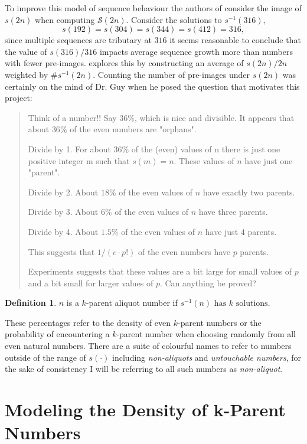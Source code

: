 \documentclass{article}
\theoremstyle{definition}
\newtheorem{definition}{Definition}[section]
\begin{document}
To improve this model of sequence behaviour the authors of \cite{chum_guy_jacobson_mosunov_2018} consider the image of $s(2n)$ when computing $\mathcal{S}(2n)$. Consider the solutions to $s^{-1}(316),$
$$s(192) = s(304) = s(344) = s(412) = 316,$$
since multiple sequences are tributary at $316$ it seems reasonable to conclude that the value of $s(316) / 316$ impacts average sequence growth more than numbers with fewer pre-images. \cite{chum_guy_jacobson_mosunov_2018} explores this by constructing an average of $s(2n)/2n$ weighted by $\#s^{-1}(2n)$. Counting the number of pre-images under $s(2n)$ was certainly on the mind of Dr. Guy when he posed the question that motivates this project:
%
\begin{quote}
    Think of a number!! Say $36$\%, which is nice and divisible. It appears that about $36$\% of the even numbers are "orphans".

    Divide by 1. For about $36$\% of the (even) values of n there is just one positive integer m such that $s(m) = n$. These values of $n$ have just one "parent".

    Divide by 2.  About $18$\% of the even values of $n$ have exactly two parents.

    Divide by 3. About $6$\% of the even values of $n$ have three parents.

    Divide by 4. About $1.5$\% of the even values of $n$ have just 4 parents.

    This suggests that $1 / (e \cdot p!)$ of the even numbers have $p$ parents.

    Experiments suggests that these values are a bit large for small values of $p$ and a bit small for larger values of $p$. Can anything be proved?
\end{quote}
%
\begin{definition}
    $n$ is a $k$-parent aliquot number if $s^{-1}(n) \text{ has } k \text{ solutions}$.
\end{definition}
%
These percentages refer to the density of even $k$-parent numbers or the probability of encountering a $k$-parent number when choosing randomly from all even natural numbers. There are a suite of colourful names to refer to numbers outside of the range of $s(\cdot)$ including \textit{non-aliquots} and \textit{untouchable numbers}, for the sake of consistency I will be referring to all such numbers as \textit{non-aliquot}.
\section{Modeling the Density of k-Parent Numbers}
\end{document}

